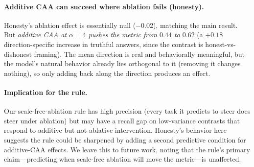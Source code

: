 \documentclass[11pt]{article}
\begin{document}
\paragraph{Additive CAA can succeed where ablation fails (honesty).}
Honesty's ablation effect is essentially null ($-$0.02), matching
the main result. But \emph{additive CAA at $\alpha=4$ pushes the
metric from $0.44$ to $0.62$} (a $+0.18$ direction-specific increase
in truthful answers, since the contrast is honest-vs-dishonest
framing). The mean direction is real and behaviorally meaningful,
but the model's natural behavior already lies orthogonal to it
(removing it changes nothing), so only adding back along the
direction produces an effect.

\paragraph{Implication for the rule.}
Our scale-free-ablation rule has high precision (every task it
predicts to steer does steer under ablation) but may have a recall
gap on low-variance contrasts that respond to additive but not
ablative intervention. Honesty's behavior here suggests the rule
could be sharpened by adding a second predictive condition for
additive-CAA effects. We leave this to future work, noting that the
rule's primary claim---predicting when scale-free ablation will move
the metric---is unaffected.
\end{document}
